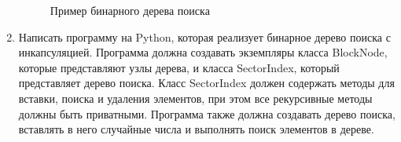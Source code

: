 \begin{enumerate}
\begin{figure}[h]
\centering
{}
\caption{Пример бинарного дерева поиска}
\end{figure}

\item Написать программу на Python, которая реализует бинарное дерево поиска с инкапсуляцией. Программа должна создавать экземпляры класса BlockNode, которые представляют узлы дерева, и класса SectorIndex, который представляет дерево поиска. Класс SectorIndex должен содержать методы для вставки, поиска и удаления элементов, при этом все рекурсивные методы должны быть приватными. Программа также должна создавать дерево поиска, вставлять в него случайные числа и выполнять поиск элементов в дереве.


\end{enumerate}
